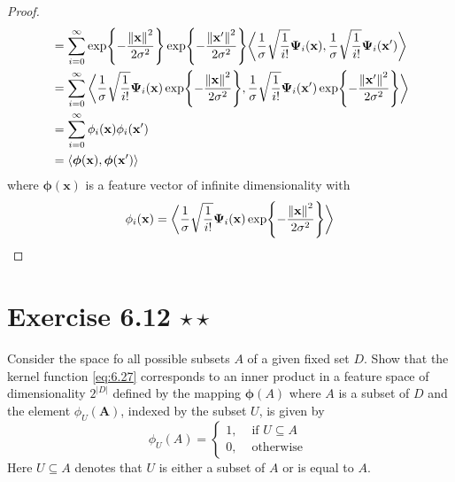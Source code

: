 \begin{proof}
\begin{align*}
        &= \sum_{i=0}^{\infty} 
        \exp{-\frac{\norm{\mathbf{x}}^2}{2\sigma^2}}
        \exp{-\frac{\norm{\mathbf{x}'}^2}{2\sigma^2}}
        \bigg\langle \frac{1}{\sigma}\sqrt{\frac{1}{i!}} \bm{\Psi}_i(\mathbf{x}),
        \frac{1}{\sigma}\sqrt{\frac{1}{i!}} \bm{\Psi}_i(\mathbf{x}') \bigg\rangle \\
        &= \sum_{i=0}^{\infty} \bigg\langle
        \frac{1}{\sigma}\sqrt{\frac{1}{i!}} \bm{\Psi}_i(\mathbf{x})
        \exp{-\frac{\norm{\mathbf{x}}^2}{2\sigma^2}},
        \frac{1}{\sigma}\sqrt{\frac{1}{i!}} \bm{\Psi}_i(\mathbf{x}')
        \exp{-\frac{\norm{\mathbf{x}'}^2}{2\sigma^2}} \bigg\rangle \\ 
        &= \sum_{i=0}^{\infty} \phi_i(\mathbf{x}) \phi_i(\mathbf{x}') \\
        &= \langle \bm{\phi}(\mathbf{x}), \bm{\phi}(\mathbf{x}') \rangle
    \end{align*}
    where $\bm{\phi}(\mathbf{x})$ is a feature vector of infinite dimensionality with
    \[
        \phi_i(\mathbf{x}) = 
        \bigg\langle
        \frac{1}{\sigma}\sqrt{\frac{1}{i!}} \bm{\Psi}_i(\mathbf{x})
        \exp{-\frac{\norm{\mathbf{x}}^2}{2\sigma^2}}\bigg\rangle
    \] 
\end{proof}

\section*{Exercise 6.12 $\star \star$}
Consider the space fo all possible subsets $A$ of a given fixed set $D$.
Show that the kernel function \eqref{eq:6.27} corresponds to an inner product in a feature
space of dimensionality $2^{|D|}$ defined by the mapping $\bm{\phi}(A)$ where $A$ 
is a subset of $D$ and the element $\phi_U(\mathbf{A})$, indexed by the subset
$U$, is given by
\begin{equation*}
    \phi_U(A) = \begin{cases}
        1, & \text{ if }  U \subseteq A \\
        0, & \text{ otherwise }
    \end{cases}
    \tag{6.95}\label{eq:6.95}
\end{equation*}
Here $U \subseteq A$ denotes that $U$ is either a subset of $A$ or is equal to $A$. 

\vspace{1em}

